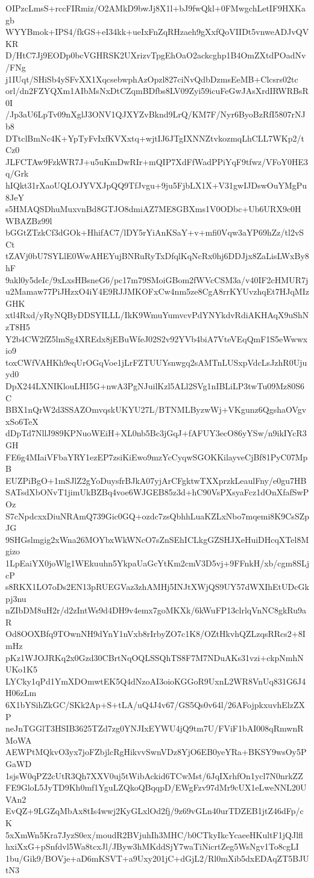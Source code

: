 OIPzcLmsS+rccFIRmiz/O2AMkD9bwJj8X1l+bJ9fwQkl+0FMwgchLetIF9HXKagb
WYYBmok+IPS4/fkGS+eI34kk+ueIxFnZqRHzaeh9gXxfQoVIIDt5vnweADJvQVKR
D/HtC7Jj9EODp0bcVGHRSK2UXrizvTpgEhOaO2ackcghp1B4OmZXtdPOadNv/FNg
j1IUqt/SHiSb4ySFvXX1XqcsebwphAzOpzl827ciNvQdbDzmsEeMB+Clcsrs02tc
orl/dn2FZYQXm1AIbMsNxDtCZqmBDfbs8LV09Zyi59icuFeGwJAsXrdIRWRBsR0I
/Jp3aU6LpTv09nXglJ3ONV1QJXYZvBknd9LrQ/KM7F/Nyr6ByoBzRfI5807rNJb8
DTtclBmNc4K+YpTyFvIxfKVXxtq+wjtIJ6JTgIXNNZtvkozmqLhCLL7WKp2/tCz0
JLFCTAw9FzkWR7J+u5uKmDwRIr+mQIP7XdFfWadPPiYqF9tfwz/VFoY0HE3q/Grk
hIQkt31rXaoUQLOJYVXJpQQ9TfJvgu+9ju5FjbLX1X+V31gwIJDswOuYMgPu8JeY
s5HMAQSDhuMuxvnBd8GTJO8dmiAZ7ME8GBXms1V0ODbc+Ub6URX9c0HWBAZBz99l
bGGtZTzkCf3dGOk+HhifAC7/lDY5rYiAnKSaY+v+mfi0Vqw3aYP69hZz/tl2vSCt
tZAVj0bU7SYLlE0WwAHEYujBNRuRyTxDfqlKqNcRx0hj6DDJjx8ZaLisLWxBy8hF
9akl0y5deIc/9xLxsHBsneG6/pc17m79SMoiGBom2fWVcCSM3a/v40IF2cHMUR7j
u2Mamaw77PiJHzxO4iY4E9RJJMKOFxCw4nm5ze8CgA8rrKYUvzhqEt7HJqMIzGHK
xtl4Rxd/yRyNQByDDSYILLL/IkK9WmuYumvcvPdYNYkdvRdiAKHAqX9uShNzT8H5
Y2b4CW2fZ5lmSg4XREdx8jEBuWfeJ02S2v92YVb4biA7VteVEqQmF1S5eWwwxio9
toxCWfVAHKh9eqUrOGqVoe1jLrFZTUUYsnwgq2sAMTnLUSxpVdcLsJzhR0Ujuyd0
DpX244LXNIKlouLHI5G+nwA3PgNJuilKzl5ALl2SVg1nIBLiLP3twTu09Mz80S6C
BBX1nQrW2d3SSAZOmvqskUKYU27L/BTNMLByzwWj+VKgunz6QgshaOVgvxSo6TeX
dDpTd7NllJ989KPNuoWEiH+XL0nb5Bc3jGqJ+fAFUY3ecO86yYSw/n9ikIYcR3GH
FE6g4MIaiVFbaYRY1ezEP7zsiKiEwo9mzYcCyqwSGOKKilayveCjBf81PyC07MpB
EUZPiBgO+1mSJlZ2gYoDuysfrBJkA07yjArCFgktwTXXprzkLeaulFny/e0gu7HB
SATsdXbONvT1jimUkBZBq4voe6WJGEB85z3d+hC90VsPXsyaFcz1dOnXfafSwPOz
S7cNpdcxxDiuNRAmQ739Gic0GQ+ozdc7zsQbhhLuaKZLxNbo7mqemi8K9CsSZpJG
9SHGslmgig2xWna26MOYbxWkWNcO7sZnSEhICLkgGZSHJXeHuiDHcqXTel8Mgizo
1LpEaiYX0joWlg1WEkuuhn5YkpaUaGcYtKm2cmV3D5vj+9FFnkH/xb/cgm8SLjcP
s8RKX1LO7oDs2EN13pRUEGVaz3zhAMHj5INJtXWjQS9UY57dWXIhEtUDcGkpj3nu
nZIbDM8uH2r/d2zIntWs9d4DH9v4emx7goMKXk/6kWuFP13clrlqVnNC8gkRu9aR
Od8OOXBfq9TOwnNH9dYnY1nVxb8rIrbyZO7c1K8/OZtHkvhQZLzqsRRcs2+8ImHz
pKz1WJOJRKq2x0Gzd30CBrtNqOQLSSQhTS8F7M7NDuAKs31vzi+ckpNmhNUKo1K5
LYCky1qPd1YmXDOmwtEK5Q4dNzoAI3oioKGGoR9UxnL2WR8VnUq831G6J4H06zLm
6X1bYSihZkGC/SKk2Ap+S+tLA/uQ4J4v67/GS5Qs0v64l/26AFojpkxuvhElzZXP
neJnTGGlT3HSIB3625TZd7zg0YNJIxEYWU4jQ9tm7U/FViF1bAI008qRmwnRMoWA
AEWPtMQkvO3yx7joFZbjlcRgHikvvSwnVDz8YjO6EB0yeYRa+BKSY9wsOy5PGaWD
1sjsW0qPZ2cUtR3Qh7XXV0uj5tWibAckid6TCwMst/6JqIXrhfOn1ycl7N0nrkZZ
FE9GloL5JyTD9Kh0mf1YguLZQkoQBqqpD/EWgFzv97dMr9cUX1eLweNNL20UVAn2
EvQZ+9LGZqMbAx8tIs4wwj2KyGLxlOd2fj/9z69vGLn40urTDZEB1jtZ46dFp/cK
5xXmWn5Kra7JyzS0ex/moudR2BVjuhIh3MHC/b0CTkyIkcYcaeeHKultF1jQJlfl
hxiXxG+pSnfdvl5Wa8tcxJl/JByw3hMKddSjY7waTiNicrtZeg5WsNgv1To8cgLI
1bu/Gik9/BOVje+aD6mKSVT+a9Uxy201jC+dGjL2/Rl0mXib5dxEDAqZT5BJUtN3
